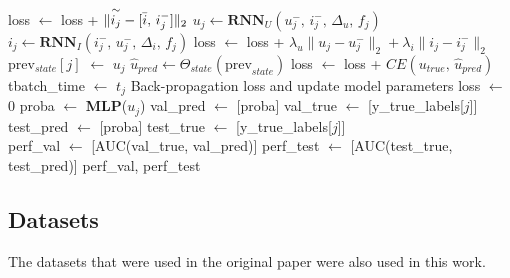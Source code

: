 \begin{algorithm}[H]
\begin{algorithmic}
            \STATE loss $\leftarrow$ loss + $\| \overset{\sim}{i_j} - [ \Bar{i}, \, i_j^-] \|_2$
            \STATE $u_j \leftarrow \textbf{RNN}_U(u_j^-,\,i_j^-,\,\Delta_u,\,f_j)$
            \STATE $i_j \leftarrow \textbf{RNN}_I(i_j^-,\,u_j^-,\,\Delta_i,\,f_j)$
            \STATE loss $\leftarrow$ loss + $\lambda_u \| u_j - u_j^- \|_2 + \lambda_i \| i_j - i_j^- \|_2$
            \STATE  prev$_{state}[j]$ $\leftarrow$ $u_j$
            \STATE $\widehat u_{pred} \leftarrow \Theta_{state}(\text{prev}_{state})$
            \STATE loss $\leftarrow$ loss + $CE(u_{true},\,\widehat u_{pred})$
                \STATE tbatch\_time $\leftarrow$ $t_j$
                \STATE Back-propagation loss and update model parameters
                \STATE loss $\leftarrow$ 0
            \ENDIF
            \STATE proba $\leftarrow$ \textbf{MLP}($u_j$)
                \STATE val\_pred $\leftarrow$ [proba]
                \STATE val\_true $\leftarrow$ [y\_true\_labels[$j$]]
            \ELSE
                \STATE test\_pred $\leftarrow$ [proba]
                \STATE test\_true $\leftarrow$ [y\_true\_labels[$j$]]
            \ENDIF
        \ENDFOR\\
        \STATE perf\_val $\leftarrow$ [AUC(val\_true, val\_pred)]
        \STATE perf\_test $\leftarrow$ [AUC(test\_true, test\_pred)]
        \RETURN perf\_val, perf\_test
    \end{algorithmic}
\end{algorithm}
\newpage
\subsection*{Datasets}

The datasets that were used in the original paper were also used in this work.\\


